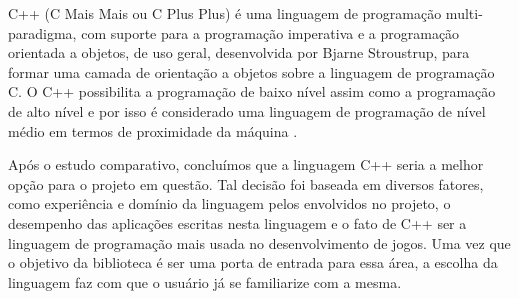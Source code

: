 %
\par
C++ (C Mais Mais ou C Plus Plus) é uma linguagem de programação multi-paradigma, com suporte para a programação imperativa e a programação orientada a objetos, de uso geral, desenvolvida por Bjarne Stroustrup, para formar uma camada de orientação a objetos sobre a linguagem de programação C. O C++ possibilita a programação de baixo nível assim como a programação de alto nível e por isso é considerado uma linguagem de programação de nível médio em termos de proximidade da máquina \cite{Mizrahi} .
\par
Após o estudo comparativo, concluímos que a linguagem C++ seria a melhor opção para o projeto em questão. Tal decisão foi baseada em diversos fatores, como experiência e domínio da linguagem pelos envolvidos no projeto, o desempenho das aplicações escritas nesta linguagem e o fato de C++ ser a linguagem de programação mais usada no desenvolvimento de jogos. Uma vez que o objetivo da biblioteca é ser uma porta de entrada para essa área, a escolha da linguagem faz com que o usuário já se familiarize com a mesma. %
%
%
